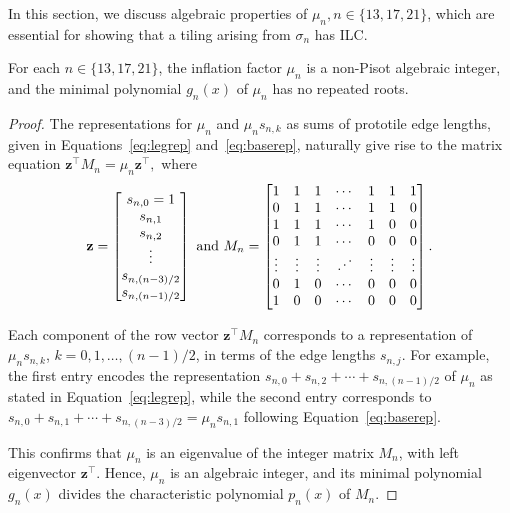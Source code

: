 \noindent In this section, we discuss algebraic properties of $\mu_n, n \in \{13,17,21\}$, which are essential for showing that a tiling arising from $\sigma_n$ has ILC. 

\begin{lem}
\label{lem:mu_n_properties}
For each $n \in \{13,17,21\}$, the inflation factor $\mu_n$ is a non-Pisot algebraic integer, and the minimal polynomial $g_n(x)$ of $\mu_{n}$ has no repeated roots.
\end{lem}

\begin{proof}
The representations for $\mu_n$ and $\mu_n s_{n,k}$ as sums of prototile edge lengths, given in Equations~\ref{eq:legrep} and~\ref{eq:baserep}, naturally give rise to the matrix equation  $\mathbf{z}^\top M_n = \mu_n \mathbf{z}^\top,$ where 
\[
\mathbf{z} = 
\begin{bmatrix}
s_{n,0}=1 \\ s_{n,1} \\ s_{n,2} \\ \vdots \\
s_{n,(n-3)/2} \\ s_{n,(n-1)/2}
\end{bmatrix} \  \mbox{and} \ 
M_n = 
 \begin{bmatrix} 1 & 1 & 1 & \cdots &1  & 1 & 1 \\ 
0 & 1 & 1 & \cdots & 1 & 1 & 0 \\ 
1 & 1 & 1 & \cdots & 1 & 0 & 0 \\ 
0 & 1 & 1 & \cdots & 0 & 0 & 0 \\ 
\vdots & \vdots & \vdots & \reflectbox{$\ddots$} & \vdots & \vdots & \vdots \\ 
0 & 1 & 0 & \cdots & 0 & 0 & 0 
\\ 1 & 0 & 0 & \cdots & 0 & 0 & 0 \\ \end{bmatrix}.
\]

Each component of the row vector $\mathbf{z}^\top M_n$ corresponds to a representation of $\mu_n s_{n,k}$, $k=0, 1, \ldots, (n-1)/2$, in terms of the edge lengths $s_{n,j}$. For example, the first entry encodes the representation  $s_{n,0} + s_{n,2} + \cdots + s_{n,(n-1)/2}$ of $\mu_n$ as stated in Equation~\ref{eq:legrep}, while the second entry corresponds to  $s_{n,0} + s_{n,1} + \cdots + s_{n,(n-3)/2} = \mu_n s_{n,1}$ following Equation~\ref{eq:baserep}.  

This confirms that $\mu_n$ is an eigenvalue of the integer matrix $M_n$, with left eigenvector $\mathbf{z}^\top$. Hence, $\mu_{n}$ is an algebraic integer, and its minimal polynomial $g_{n}(x)$ divides the characteristic polynomial $p_n(x)$ of $M_n$.


\end{proof}
